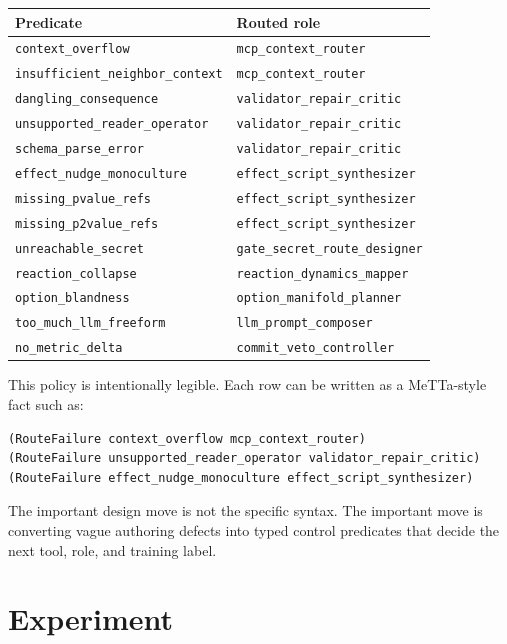 \documentclass[11pt]{article}
\begin{document}
\begin{center}
\begin{tabular}{ll}
\toprule
Predicate & Routed role \\
\midrule
\texttt{context\_overflow} & \texttt{mcp\_context\_router} \\
\texttt{insufficient\_neighbor\_context} & \texttt{mcp\_context\_router} \\
\texttt{dangling\_consequence} & \texttt{validator\_repair\_critic} \\
\texttt{unsupported\_reader\_operator} & \texttt{validator\_repair\_critic} \\
\texttt{schema\_parse\_error} & \texttt{validator\_repair\_critic} \\
\texttt{effect\_nudge\_monoculture} & \texttt{effect\_script\_synthesizer} \\
\texttt{missing\_pvalue\_refs} & \texttt{effect\_script\_synthesizer} \\
\texttt{missing\_p2value\_refs} & \texttt{effect\_script\_synthesizer} \\
\texttt{unreachable\_secret} & \texttt{gate\_secret\_route\_designer} \\
\texttt{reaction\_collapse} & \texttt{reaction\_dynamics\_mapper} \\
\texttt{option\_blandness} & \texttt{option\_manifold\_planner} \\
\texttt{too\_much\_llm\_freeform} & \texttt{llm\_prompt\_composer} \\
\texttt{no\_metric\_delta} & \texttt{commit\_veto\_controller} \\
\bottomrule
\end{tabular}
\end{center}

This policy is intentionally legible. Each row can be written as a MeTTa-style fact such as:

\begin{verbatim}
(RouteFailure context_overflow mcp_context_router)
(RouteFailure unsupported_reader_operator validator_repair_critic)
(RouteFailure effect_nudge_monoculture effect_script_synthesizer)
\end{verbatim}

The important design move is not the specific syntax. The important move is converting vague authoring defects into typed control predicates that decide the next tool, role, and training label.

\section{Experiment}
\end{document}
